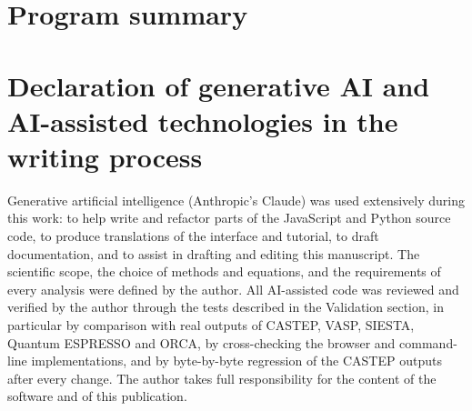 \documentclass[preprint,review,12pt]{elsarticle}%
\def\BMRbibstyle{elsarticle-num}%
\begin{document}
\begin{frontmatter}


\begin{abstract}

\end{abstract}
\begin{highlights}

\end{highlights}
\begin{keyword}

\end{keyword}
\end{frontmatter}

\linenumbers

\section*{Program summary}
















\section*{Declaration of generative AI and AI-assisted technologies in the writing process}
Generative artificial intelligence (Anthropic's Claude) was used extensively during this work: to help write and refactor parts of the JavaScript and Python source code, to produce translations of the interface and tutorial, to draft documentation, and to assist in drafting and editing this manuscript. The scientific scope, the choice of methods and equations, and the requirements of every analysis were defined by the author. All AI-assisted code was reviewed and verified by the author through the tests described in the Validation section, in particular by comparison with real outputs of CASTEP, VASP, SIESTA, Quantum ESPRESSO and ORCA, by cross-checking the browser and command-line implementations, and by byte-by-byte regression of the CASTEP outputs after every change. The author takes full responsibility for the content of the software and of this publication.


\appendix




\end{document}
